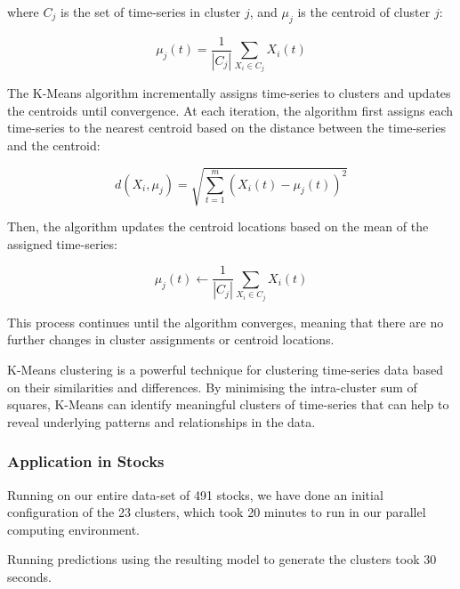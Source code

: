 \documentclass[11pt]{article}
\begin{document}
where $C_j$ is the set of time-series in cluster $j$, and $\mu_j$ is the centroid of cluster $j$:

$$\mu_j(t) = \frac{1}{|C_j|} \sum_{X_i \in C_j} X_i(t)$$

The K-Means algorithm incrementally assigns time-series to clusters and updates the centroids until convergence. At each iteration, the algorithm first assigns each time-series to the nearest centroid based on the distance between the time-series and the centroid:

$$d(X_i, \mu_j) = \sqrt{\sum_{t=1}^m (X_i(t) - \mu_j(t))^2}$$

Then, the algorithm updates the centroid locations based on the mean of the assigned time-series:

$$\mu_j(t) \leftarrow \frac{1}{|C_j|} \sum_{X_i \in C_j} X_i(t)$$

This process continues until the algorithm converges, meaning that there are no further changes in cluster assignments or centroid locations.

K-Means clustering is a powerful technique for clustering time-series data based on their similarities and differences. By minimising the intra-cluster sum of squares, K-Means can identify meaningful clusters of time-series that can help to reveal underlying patterns and relationships in the data.

\subsubsection{Application in Stocks}

Running on our entire data-set of 491 stocks, we have done an initial configuration of the 23 clusters, which took 20 minutes to run in our parallel computing environment. 

Running predictions using the resulting model to generate the clusters took 30 seconds.
\end{document}
